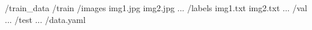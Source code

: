 /train_data
    /train
        /images
            img1.jpg
            img2.jpg
            ...
        /labels
            img1.txt
            img2.txt
            ...
    /val
    ...
    /test
    ...
    /data.yaml